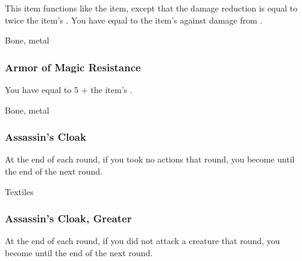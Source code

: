 This item functions like the  item, except that the damage reduction is equal to twice the item's .
You have  equal to the item's  against damage from .



 


 Bone, metal


\lowercase{\hypertarget{item:Armor of Magic Resistance}{}}\label{item:Armor of Magic Resistance}
\hypertarget{item:Armor of Magic Resistance}{\subsubsection{Armor of Magic Resistance\hfill{}}}

You have  equal to 5 + the item's .



 


 Bone, metal


\lowercase{\hypertarget{item:Assassin's Cloak}{}}\label{item:Assassin's Cloak}
\hypertarget{item:Assassin's Cloak}{\subsubsection{Assassin's Cloak\hfill{}}}

At the end of each round, if you took no actions that round, you become  until the end of the next round.



 


 Textiles


\lowercase{\hypertarget{item:Assassin's Cloak, Greater}{}}\label{item:Assassin's Cloak, Greater}
\hypertarget{item:Assassin's Cloak, Greater}{\subsubsection{Assassin's Cloak, Greater\hfill{}}}

At the end of each round, if you did not attack a creature that round, you become  until the end of the next round.



 


